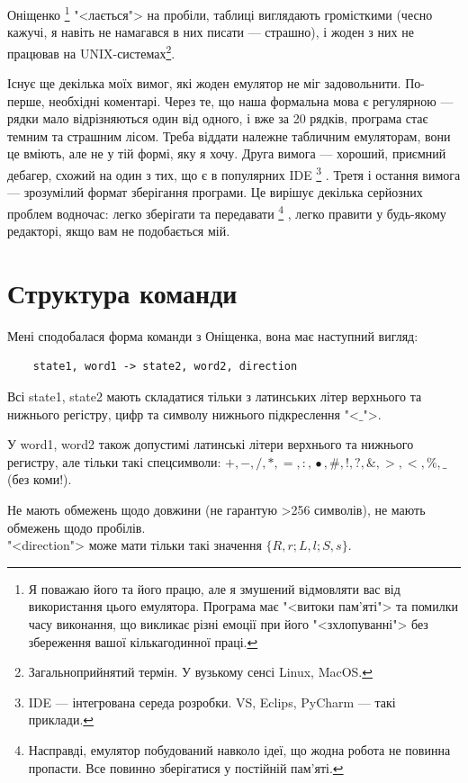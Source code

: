 \documentclass[oneside,final,14pt]{extreport}
\begin{document}
Оніщенко
\footnote{Я поважаю його та його працю, але я змушений відмовляти вас від використання цього емулятора. Програма має "<витоки пам'яті"> та помилки часу виконання, що викликає різні емоції при його "<зхлопуванні"> без збереження вашої кількагодинної праці.}
 "<лається"> на пробіли, таблиці виглядають громісткими (чесно кажучі, я навіть не намагався в них писати --- страшно), і жоден з них не працював на UNIX-системах\footnote{Загальноприйнятий термін. У вузькому сенсі Linux, MacOS.}.

Існує ще декілька моїх вимог, які жоден емулятор не міг задовольнити. По-перше, необхідні коментарі. Через те, що наша формальна мова є регулярною  --- рядки мало відрізняються один від одного, і вже за 20 рядків, програма стає темним та страшним лісом. Треба віддати належне табличним емуляторам, вони це вміють, але не у тій формі, яку я хочу.
Друга вимога --- хороший, приємний дебагер, схожий на один з тих, що є в популярних IDE
\footnote{IDE --- інтегрована середа розробки. VS, Eclips, PyCharm --- такі приклади.}
. Третя і остання вимога --- зрозумілий формат зберігання програми. Це вирішує декілька серйозних проблем водночас: легко зберігати та передавати
\footnote{Насправді, емулятор побудований навколо ідеї, що жодна робота не повинна пропасти. Все повинно зберігатися у постійній пам'яті.}
, легко правити у будь-якому редакторі, якщо вам не подобається мій.

\section{Структура команди}

Мені сподобалася форма команди з Оніщенка, вона має наступний вигляд:

\begin{verbatim}
	state1, word1 -> state2, word2, direction
\end{verbatim}

Всі state1, state2 мають складатися тільки з латинських літер верхнього та нижнього регістру, цифр та символу нижнього підкреслення "<$\_$">.
		
У word1, word2 також допустимі латинські літери верхнього та нижнього регистру, але тільки такі спецсимволи: $+,-,/,*,=,:,\hat{•},\#,!,?,\&,>,<,\%,\_$\\ (без коми!). 
		
Не мають обмежень щодо довжини (не гарантую >256 символів), не мають обмежень щодо пробілів.
\\
"<direction">  може мати тільки такі значення $\{R,r;L,l;S,s\}$.
\end{document}
